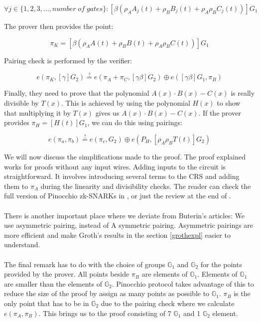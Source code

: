 $$\forall j \in \{1, 2, 3, \ldots, number\;of\;gates\} : [\beta(\rho_A A_j(t) + \rho_B B_j(t) + \rho_A \rho_B C_j(t))]G_1 $$

\noindent The prover then provides the point:

$$ \pi_{K} = [\beta(\rho_A A(t) + \rho_B B(t) + \rho_A \rho_B C(t))]G_1 $$

\noindent Pairing check is performed by the verifier:

$$ e(\pi_K, [\gamma]G_2) \stackrel{?}{=} e(\pi_A + \pi_C, [\gamma\beta]G_2) \oplus e([\gamma\beta]G_1, \pi_B) $$

\noindent Finally, they need to prove that the polynomial $A(x) \cdot B(x) - C(x)$ is really divisible by $T(x)$. This is achieved by using the polynomial $H(x)$ to show that multiplying it by $T(x)$ gives us $A(x) \cdot B(x) - C(x)$. If the prover provides $\pi_H = [H(t)]G_1$, we can do this using pairings:

$$ e(\pi_a, \pi_b) \stackrel{?}{=} e(\pi_c, G_2) \oplus e(P_H, [\rho_A \rho_B T(t)]G_2) $$

\noindent We will now discuss the simplifications made to the proof. The proof explained works for proofs without any input wires. Adding inputs to the circuit is straightforward. It involves introducing several terms to the CRS and adding them to $\pi_A$ during the linearity and divisibility checks. The reader can check the full version of Pinocchio zk-SNARKs in \cite{parno2013pinocchio}, or just the review at the end of \cite{ben2014succinct}.\\
\\
There is another important place where we deviate from Buterin's articles: We use asymmetric pairing, instead of A symmetric pairing. Asymmetric pairings are more efficient and make Groth's results in the section \ref{grothexpl} easier to understand.\\
\\
The final remark has to do with the choice of groups $\mathbb{G}_1$ and $\mathbb{G}_2$ for the points provided by the prover. All points beside $\pi_B$ are elements of $\mathbb{G}_1$. Elements of $\mathbb{G}_1$ are smaller than the elements of $\mathbb{G}_2$. Pinocchio protocol takes advantage of this to reduce the size of the proof by assign as many points as possible to $\mathbb{G}_1$. $\pi_B$ is the only point that has to be in $\mathbb{G}_2$ due to the pairing check where we calculate $e(\pi_A, \pi_B)$. This brings us to the proof consisting of 7 $\mathbb{G}_1$ and 1 $\mathbb{G}_2$ element.

